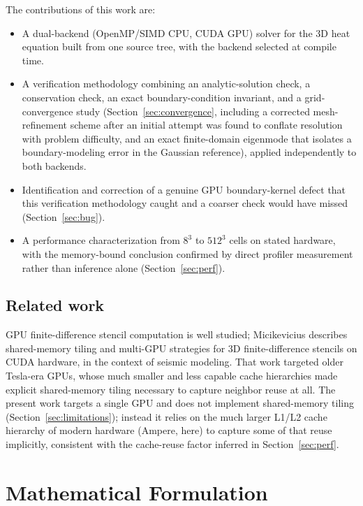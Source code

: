 \documentclass[conference]{IEEEtran}
\begin{document}
The contributions of this work are:
\begin{itemize}
  \item A dual-backend (OpenMP/SIMD CPU, CUDA GPU) solver for the 3D heat equation
    built from one source tree, with the backend selected at compile time.
  \item A verification methodology combining an analytic-solution check, a
    conservation check, an exact boundary-condition invariant, and a grid-convergence
    study (Section~\ref{sec:convergence}, including a corrected mesh-refinement scheme
    after an initial attempt was found to conflate resolution with problem difficulty,
    and an exact finite-domain eigenmode that isolates a boundary-modeling error in the
    Gaussian reference), applied independently to both backends.
  \item Identification and correction of a genuine GPU boundary-kernel defect that
    this verification methodology caught and a coarser check would have missed
    (Section~\ref{sec:bug}).
  \item A performance characterization from $8^3$ to $512^3$ cells on stated hardware,
    with the memory-bound conclusion confirmed by direct profiler measurement rather
    than inference alone (Section~\ref{sec:perf}).
\end{itemize}

\subsection{Related work}

GPU finite-difference stencil computation is well studied; Micikevicius
\cite{micikevicius2009} describes shared-memory tiling and multi-GPU strategies for
3D finite-difference stencils on CUDA hardware, in the context of seismic modeling.
That work targeted older Tesla-era GPUs, whose much smaller and less capable cache
hierarchies made explicit shared-memory tiling necessary to capture neighbor reuse at
all. The
present work targets a single GPU and does not implement shared-memory tiling
(Section~\ref{sec:limitations}); instead it relies on the much larger L1/L2 cache
hierarchy of modern hardware (Ampere, here) to capture some of that reuse implicitly,
consistent with the cache-reuse factor inferred in Section~\ref{sec:perf}.

\section{Mathematical Formulation}
\end{document}
